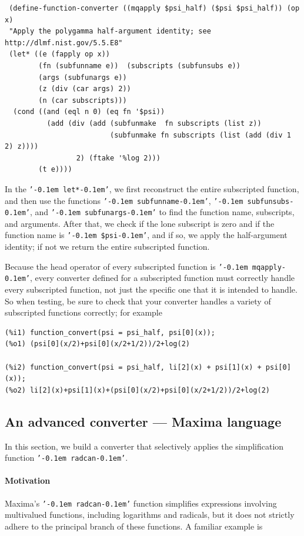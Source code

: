 \documentclass[12pt,fleqn]{extarticle}
\newcommand{\ttq}[1]{\texttt{'\kern-0.1em #1\kern-0.1em'}}
\newenvironment{maximabox}
  {\begin{tcolorbox}[
      breakable,
      enhanced,
      colback=white,
      colframe=black!8,
      boxrule=0pt,
      borderline west={2.2pt}{0pt}{black!25},
      arc=1pt,
      left=11pt,
      right=7pt,
      top=9pt,
      bottom=9pt,
      before skip=14pt,
      after skip=14pt
    ]}
  {\end{tcolorbox}}
\begin{document}
 \begin{maximabox}
 \begin{verbatim}
 (define-function-converter ((mqapply $psi_half) ($psi $psi_half)) (op x)
 "Apply the polygamma half-argument identity; see http://dlmf.nist.gov/5.5.E8"
 (let* ((e (fapply op x)) 
        (fn (subfunname e))  (subscripts (subfunsubs e)) 
        (args (subfunargs e)) 
        (z (div (car args) 2)) 
        (n (car subscripts)))
  (cond ((and (eql n 0) (eq fn '$psi))
          (add (div (add (subfunmake  fn subscripts (list z))
                         (subfunmake fn subscripts (list (add (div 1 2) z))))
                 2) (ftake '%log 2)))
        (t e))))
   \end{verbatim}
 \end{maximabox}
In the \ttq{let*}, we first reconstruct the entire subscripted function, and then use
the functions \ttq{subfunname}, \ttq{subfunsubs}, and \ttq{subfunargs} to find the function name,
subscripts, and arguments.  After that, we check if the lone subscript is zero and if
the function name is \ttq{\$psi}, and if so, we
apply the half-argument identity; if not we return the entire subscripted function. 

Because the head operator of every subscripted function is \ttq{mqapply}, every converter
defined for a subscripted function must correctly handle every subscripted function, not just
the specific one that it is intended to handle. So when testing, be sure to check that your
converter handles a variety of subscripted functions correctly; for example
\begin{maximabox}
\begin{verbatim}
(%i1) function_convert(psi = psi_half, psi[0](x));
(%o1) (psi[0](x/2)+psi[0](x/2+1/2))/2+log(2)

(%i2) function_convert(psi = psi_half, li[2](x) + psi[1](x) + psi[0](x));
(%o2) li[2](x)+psi[1](x)+(psi[0](x/2)+psi[0](x/2+1/2))/2+log(2)
\end{verbatim}
\end{maximabox}


\subsection{An advanced converter --- Maxima language}

In this section, we build a converter that selectively applies the simplification function \ttq{radcan}.

\paragraph{Motivation}
Maxima’s \ttq{radcan} function simplifies expressions involving multivalued functions, including logarithms and radicals, but it does not strictly adhere to the principal branch of these functions. A familiar example is
\end{document}

